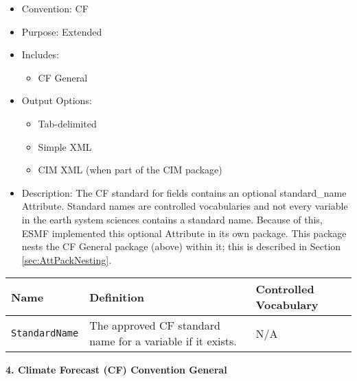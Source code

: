 \begin{itemize}
    \item Convention: CF
    \item Purpose: Extended
    \item Includes: 
    \begin{itemize}
        \item CF General
    \end{itemize}
    \item Output Options: 
    \begin{itemize}
        \item Tab-delimited
        \item Simple XML
        \item CIM XML (when part of the CIM package)
    \end{itemize} 
    \item Description: The CF standard for fields contains an optional standard\_name Attribute. Standard names are controlled vocabularies and not every variable in the earth system sciences contains a standard name. Because of this, ESMF implemented this optional Attribute in its own package. This package nests the CF General package (above) within it; this is described in Section \ref{sec:AttPackNesting}.
\end{itemize}

\begin{tabular}{|p{6cm}|p{10cm}|p{10cm}|}
    {\bf Name } & {\bf Definition} & {\bf Controlled Vocabulary} \\
    \hline\hline
    {\tt StandardName} & The approved CF standard name for a variable if it exists. &  N/A\\
\end{tabular}

\vspace{.20in}

{\bf 4. Climate Forecast (CF) Convention General}

